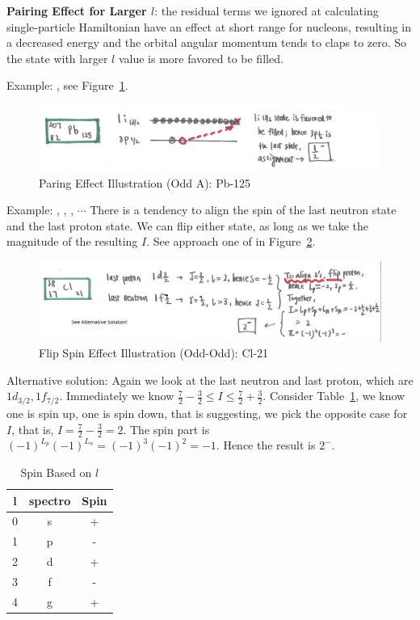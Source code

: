 \documentclass{school-22.101-notes}
\begin{document}
\textbf{Pairing Effect for Larger $l$}: the residual terms we ignored at calculating single-particle Hamiltonian have an effect at short range for nucleons, resulting in a decreased energy and the orbital angular momentum tends to claps to zero. So the state with larger $l$ value is more favored to be filled. 

Example: , see Figure~\ref{ns-Pb-125}.
\begin{figure}
    \centering
    \includegraphics[width=5in]{images/ns/Pb-125.png}
    \caption{Paring Effect Illustration (Odd A): Pb-125}
    \label{ns-Pb-125}
\end{figure}

Example: , , , $\cdots$
There is a tendency to align the spin of the last neutron state and the last proton state. We can flip either state, as long as we take the magnitude of the resulting $I$. See approach one of  in Figure~\ref{ns-Cl-21}.
\begin{figure}
    \centering
    \includegraphics[width=5in]{images/ns/Cl-21.png}
    \caption{Flip Spin Effect Illustration (Odd-Odd): Cl-21}
    \label{ns-Cl-21}
\end{figure}
Alternative solution: Again we look at the last neutron and last proton, which are $1d_{3/2}, 1f_{7/2}$. Immediately we know $ \frac{7}{2} - \frac{3}{2} \le I \le \frac{7}{2} + \frac{3}{2}$. Consider Table~\ref{spin-l}, we know one is spin up, one is spin down, that is suggesting, we pick the opposite case for $I$, that is, $I=\frac{7}{2} - \frac{3}{2} =2$. The spin part is $(-1)^{L_p} (-1)^{L_n} = (-1)^3 (-1)^2 = -1$. Hence the result is $2^-$.  
\begin{table}[ht]
\centering
\begin{tabular}{|c|c|c|} \hline
l & spectro & Spin \\ \hline
0 & s & + \\ \hline
1 & p & - \\ \hline
2 & d & + \\ \hline
3 & f & - \\ \hline
4 & g & + \\ \hline
\end{tabular}
\caption{Spin Based on $l$\label{spin-l}}
\end{table}
\end{document}
